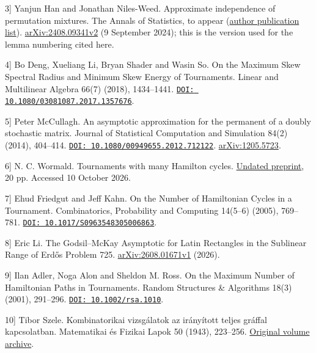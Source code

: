 \documentclass[11pt,a4paper]{article}
\begin{document}
\hypertarget{bib-3}{}\label{bib-3}\noindent {[}3{]} Yanjun Han and Jonathan Niles-Weed. Approximate independence of permutation mixtures. The Annals of Statistics, to appear (\href{https://yanjunhan2021.github.io/publication.html}{author publication list}). \href{https://arxiv.org/html/2408.09341v2}{arXiv:2408.09341v2} (9 September 2024); this is the version used for the lemma numbering cited here.

\hypertarget{bib-4}{}\label{bib-4}\noindent {[}4{]} Bo Deng, Xueliang Li, Bryan Shader and Wasin So. On the Maximum Skew Spectral Radius and Minimum Skew Energy of Tournaments. Linear and Multilinear Algebra 66(7) (2018), 1434--1441. \href{https://doi.org/10.1080/03081087.2017.1357676}{\nolinkurl{DOI: 10.1080/03081087.2017.1357676}}.

\hypertarget{bib-5}{}\label{bib-5}\noindent {[}5{]} Peter McCullagh. An asymptotic approximation for the permanent of a doubly stochastic matrix. Journal of Statistical Computation and Simulation 84(2) (2014), 404--414. \href{https://doi.org/10.1080/00949655.2012.712122}{\nolinkurl{DOI: 10.1080/00949655.2012.712122}}. \href{https://arxiv.org/abs/1205.5723}{arXiv:1205.5723}.

\hypertarget{bib-6}{}\label{bib-6}\noindent {[}6{]} N. C. Wormald. Tournaments with many Hamilton cycles. \href{https://users.monash.edu.au/~nwormald/papers/hamtourn.pdf}{Undated preprint}, 20 pp. Accessed 10 October 2026.

\hypertarget{bib-7}{}\label{bib-7}\noindent {[}7{]} Ehud Friedgut and Jeff Kahn. On the Number of Hamiltonian Cycles in a Tournament. Combinatorics, Probability and Computing 14(5--6) (2005), 769--781. \href{https://doi.org/10.1017/S0963548305006863}{\nolinkurl{DOI: 10.1017/S0963548305006863}}.

\hypertarget{bib-8}{}\label{bib-8}\noindent {[}8{]} Eric Li. The Godsil--McKay Asymptotic for Latin Rectangles in the Sublinear Range of Erdős Problem 725. \href{https://arxiv.org/html/2608.01671v1}{arXiv:2608.01671v1} (2026).

\hypertarget{bib-9}{}\label{bib-9}\noindent {[}9{]} Ilan Adler, Noga Alon and Sheldon M. Ross. On the Maximum Number of Hamiltonian Paths in Tournaments. Random Structures \& Algorithms 18(3) (2001), 291--296. \href{https://doi.org/10.1002/rsa.1010}{\nolinkurl{DOI: 10.1002/rsa.1010}}.

\hypertarget{bib-10}{}\label{bib-10}\noindent {[}10{]} Tibor Szele. Kombinatorikai vizsgálatok az irányított teljes gráffal kapcsolatban. Matematikai és Fizikai Lapok 50 (1943), 223--256. \href{https://real-j.mtak.hu/7300/}{Original volume archive}.
\end{document}
